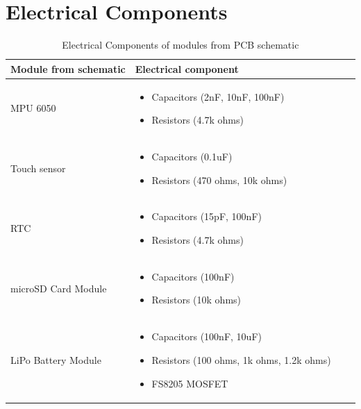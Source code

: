 \documentclass[12pt, titlepage]{article}
\begin{document}
\section{Electrical Components}
\begin{table}[H]
	\begin{tabularx}{1.05\textwidth} { 
		  | >{\centering\arraybackslash}X 
		  | >{\centering\arraybackslash}X 
		  | >{\centering\arraybackslash}X 
		  | >{\centering\arraybackslash}X | }
		 \hline
		 \textbf{Module from schematic} & \textbf{Electrical component}\\
		\hline
		 MPU 6050  & \begin{itemize}
						\item{Capacitors (2nF, 10nF, 100nF)}
						\item{Resistors (4.7k ohms)}
					\end{itemize}\\
		\hline
		 Touch sensor  & \begin{itemize}
						\item{Capacitors (0.1uF)}
						\item{Resistors (470 ohms, 10k ohms)}
					\end{itemize}\\
		 \hline
		 RTC  & \begin{itemize}
						\item{Capacitors (15pF, 100nF)}
						\item{Resistors (4.7k ohms)}
					\end{itemize}\\
		 \hline
		 microSD Card Module & \begin{itemize}
						\item{Capacitors (100nF)}
						\item{Resistors (10k ohms)}
					\end{itemize}\\
		 \hline
		 LiPo Battery Module  & \begin{itemize}
						\item{Capacitors (100nF, 10uF)}
						\item{Resistors (100 ohms, 1k ohms, 1.2k ohms)}
						\item{FS8205 MOSFET}
					\end{itemize}\\
		 \hline
	\end{tabularx}
\caption{\label{DesignElectrical}Electrical Components of modules from PCB schematic}  
\end{table}
\end{document}
